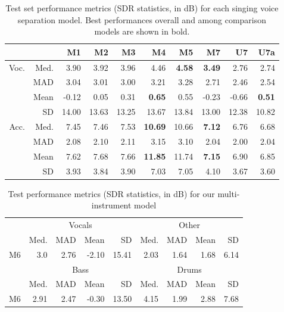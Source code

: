 \documentclass{article}
\begin{document}
\begin{table}[t]
\begingroup
\scriptsize
\setlength{\tabcolsep}{3.8pt} \renewcommand{\arraystretch}{0.95} \begin{tabular}{|rr|rrrrr|rrr|}
\hline
& & M1 & M2 & M3 & M4 & M5 & M7 & U7 & U7a \\
\hline
\multirow{4}{*}{Voc.} & Med. & 3.90 & 3.92 & 3.96 & 4.46 &\textbf{4.58} & \textbf{3.49} & 2.76 & 2.74 \\
& MAD & 3.04 & 3.01 & 3.00 & 3.21 & 3.28 & 2.71 & 2.46 & 2.54 \\
& Mean & -0.12 & 0.05 & 0.31 & \textbf{0.65} & 0.55 & -0.23 & -0.66 & \textbf{0.51} \\
& SD & 14.00 & 13.63 & 13.25 & 13.67 & 13.84 & 13.00 & 12.38 & 10.82 \\
\hline
\multirow{4}{*}{Acc.} & Med. & 7.45 & 7.46 & 7.53 & \textbf{10.69} & 10.66 & \textbf{7.12} & 6.76 & 6.68 \\
& MAD & 2.08 & 2.10 & 2.11 & 3.15 & 3.10 & 2.04 & 2.00 & 2.04 \\
& Mean & 7.62 & 7.68 & 7.66 & \textbf{11.85} & 11.74 & \textbf{7.15} & 6.90 & 6.85 \\
& SD & 3.93 & 3.84 & 3.90 & 7.03 & 7.05 & 4.10 & 3.67 & 3.60 \\
\hline
\end{tabular}
\endgroup
\caption{Test set performance metrics (SDR statistics, in dB) for each singing voice separation model. Best performances overall and among comparison models are shown in bold.}
\label{tab:results}
\end{table}

\begin{table}[t]
\begingroup
\scriptsize
\setlength{\tabcolsep}{5.8pt} \begin{tabular}{|r|rrrr|rrrr|}
\hline
& \multicolumn{4}{c}{Vocals} & \multicolumn{4}{c|}{Other} \\
& Med. & MAD & Mean & SD & Med. & MAD & Mean & SD  \\
\hline
M6 & 3.0 & 2.76 & -2.10 & 15.41 & 2.03 & 1.64 & 1.68 & 6.14 \\
\hline
\hline
& \multicolumn{4}{c}{Bass} & \multicolumn{4}{c|}{Drums} \\
& Med. & MAD & Mean & SD & Med. & MAD & Mean & SD \\
\hline
M6 & 2.91 & 2.47 & -0.30 & 13.50 & 4.15 & 1.99 & 2.88 & 7.68 \\
\hline
\end{tabular}
\endgroup
\caption{Test performance metrics (SDR statistics, in dB) for our multi-instrument model}
\label{tab:multi_instrument_results}
\end{table}
\end{document}
